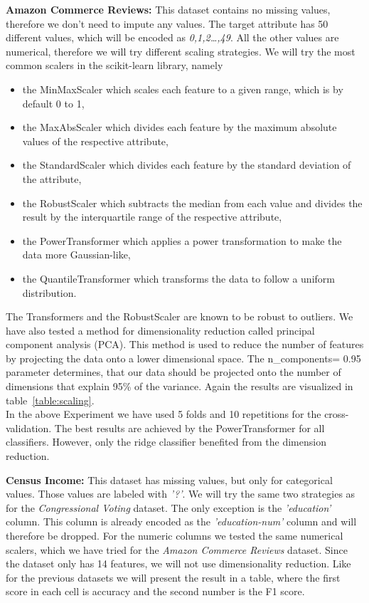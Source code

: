 \documentclass[a4paper,10pt]{article}
\begin{document}
\textbf{Amazon Commerce Reviews:} This dataset contains no missing values, therefore we don't need to impute any values.
The target attribute has 50 different values, which will be encoded as \textit{0,1,2\ldots,49}. 
All the other values are numerical, therefore we will try different scaling strategies.
We will try the most common scalers in the scikit-learn library, namely 
\begin{itemize}
    \item the MinMaxScaler which scales each feature to a given range, which is by default 0 to 1,
    \item the MaxAbsScaler which divides each feature by the maximum absolute values of the respective attribute,
    \item the StandardScaler which divides each feature by the standard deviation of the attribute,
    \item the RobustScaler which subtracts the median from each value and divides the result by the interquartile range of the respective attribute,
    \item the PowerTransformer which applies a power transformation to make the data more Gaussian-like,
    \item the QuantileTransformer which transforms the data to follow a uniform distribution.
\end{itemize}
The Transformers and the RobustScaler are known to be robust to outliers. We have also tested a method for dimensionality reduction called
principal component analysis (PCA). This method is used to reduce the number of features by projecting the data onto a lower dimensional space. 
The n\_components= 0.95 parameter determines, that our data should be projected onto the number of dimensions that explain 95\% of the variance.
Again the results are visualized in table~\ref{table:scaling}.\\
In the above Experiment we have used 5 folds and 10 repetitions for the cross-validation. The best results are achieved by the PowerTransformer for all classifiers. However, only the ridge classifier benefited from the
dimension reduction.

\textbf{Census Income:} This dataset has missing values, but only for categorical values.
 Those values are labeled with \textit{'?'}. We will try the same two strategies as for the \textit{Congressional Voting} dataset.
 The only exception is the \textit{'education'} column. This column is already encoded as the
 \textit{'education-num'} column and will therefore be dropped. For the numeric columns 
 we tested the same numerical scalers, which we have tried for the 
 \textit{Amazon Commerce Reviews} dataset. Since the dataset only has 14 features,
we will not use dimensionality reduction. Like for the previous
datasets we will present the result in a table, where the first score in each cell is accuracy and the second
number is the F1 score.
\end{document}
